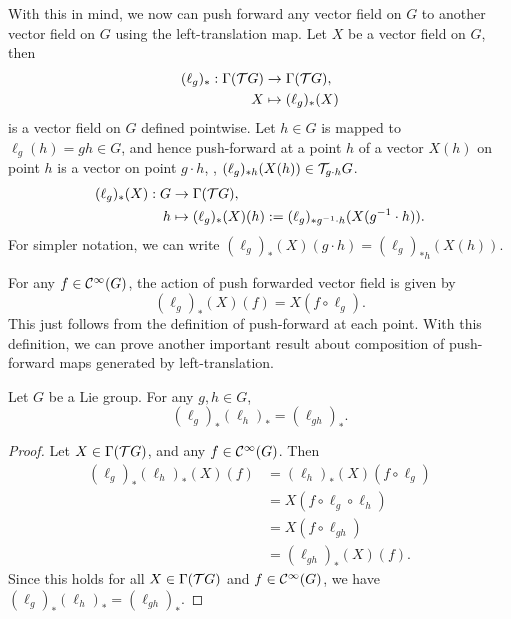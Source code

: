 With this in mind, we now can push forward any vector field on \(G\) to another vector field on \(G\) using the left-translation map. Let \(X\) be a vector field on \(G\), then
\begin{align*}
    (\ell_g)_*: \Gamma(\mathcal T G) & \to \Gamma(\mathcal T G),    \\
    X                         & \mapsto (\ell_g)_*(X)
\end{align*}
is a vector field on \(G\) defined pointwise. Let \(h \in G\) is mapped to \(\ell_g(h) = g h \in G\), and hence push-forward at a point \(h\) of a vector \(X(h)\) on point \(h\) is a vector on point \(g \cdot h\), \ie, \((\ell_g)_{* h}(X(h)) \in \mathcal T_{g \cdot h} G\).
\begin{align*}
    (\ell_g)_*(X): G & \to \Gamma(\mathcal T G),                                                         \\
    h                & \mapsto (\ell_g)_*(X)(h) := (\ell_g)_{* g^{-1} \cdot h}(X(g ^{-1} \cdot h)).
\end{align*}
For simpler notation, we can write \((\ell_g)_*(X)(g \cdot h) = (\ell_g)_{* h}(X(h))\).

For any \(f \in \mathcal C^\infty(G)\), the action of push forwarded vector field is given by
\begin{equation*}
    (\ell_g)_*(X)(f) = X(f \circ \ell_g).
\end{equation*}
This just follows from the definition of push-forward at each point. With this definition, we can prove another important result about composition of push-forward maps generated by left-translation.
\begin{proposition}
    Let \(G\) be a Lie group. For any \(g, h \in G\),
    \begin{equation*}
        (\ell_g)_* (\ell_h)_* = (\ell_{g h})_*.
    \end{equation*}
\end{proposition}
\begin{proof}
    Let \(X \in \Gamma(\mathcal T G)\), and any \(f \in \mathcal C^\infty(G)\). Then
    \begin{align*}
        (\ell_g)_*(\ell_h)_*(X)(f) & = (\ell_h)_*(X)(f \circ \ell_g)  \\
                                   & = X(f \circ \ell_g \circ \ell_h) \\
                                   & = X(f \circ \ell_{g h})          \\
                                   & = (\ell_{g h})_*(X)(f).
    \end{align*}
    Since this holds for all \(X \in \Gamma(\mathcal T G)\) and \(f \in \mathcal C^\infty(G)\), we have \((\ell_g)_*(\ell_h)_* = (\ell_{g h})_*\).
\end{proof}

